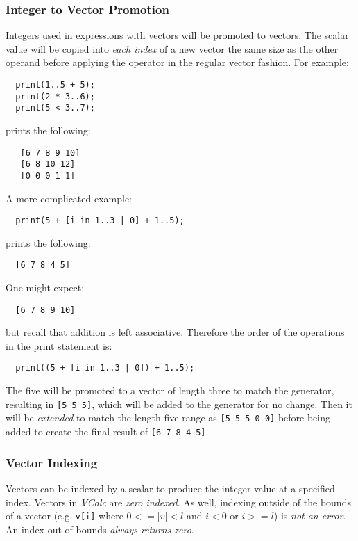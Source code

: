 \documentclass{article}
\newcommand{\code}[1]{\texttt{\textmd{#1}}}
\begin{document}
\subsubsection{Integer to Vector Promotion}
Integers used in expressions with vectors will be promoted to vectors. The scalar value will be
copied into \textit{each index} of a new vector the same size as the other operand before applying
the operator in the regular vector fashion. For example:
\begin{lstlisting}
  print(1..5 + 5);
  print(2 * 3..6);
  print(5 < 3..7);
\end{lstlisting}

 prints the following:
 \begin{lstlisting}
   [6 7 8 9 10]
   [6 8 10 12]
   [0 0 0 1 1]
 \end{lstlisting}

A more complicated example:
\begin{lstlisting}
  print(5 + [i in 1..3 | 0] + 1..5);
\end{lstlisting}

prints the following:
\begin{lstlisting}
  [6 7 8 4 5]
\end{lstlisting}

One might expect:
\begin{lstlisting}
  [6 7 8 9 10]
\end{lstlisting}

but recall that addition is left associative. Therefore the order of the operations in the print
statement is:
\begin{lstlisting}
  print((5 + [i in 1..3 | 0]) + 1..5);
\end{lstlisting}

The five will be promoted to a vector of length three to match the generator, resulting in
\code{[5 5 5]}, which will be added to the generator for no change. Then it will be
\textit{extended} to match the length five range as \code{[5 5 5 0 0]} before being added to create
the final result of \code{[6 7 8 4 5]}.

\subsubsection{Vector Indexing}
Vectors can be indexed by a scalar to produce the integer value at a specified index. Vectors in
\textit{VCalc} are \textit{zero indexed}. As well, indexing outside of the bounds of a vector (e.g.
\code{v[i]} where $ 0 <= |v| < l$ and $ i < 0 $ or $ i >= l$) is \textit{not an error}. An
index out of bounds \textit{always returns zero}.
\end{document}
